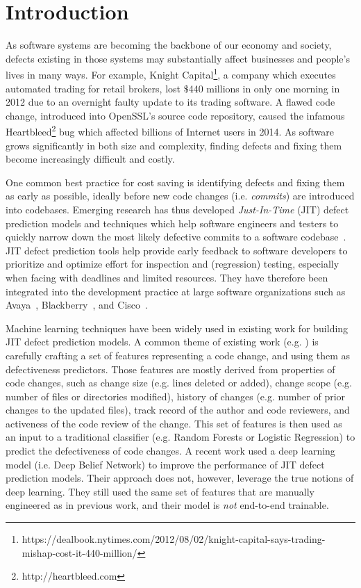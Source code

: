 \section{Introduction}
\label{sec:intro}
As software systems are becoming the backbone of our economy and society, defects existing in those systems may substantially affect businesses and people's lives  in many ways. For example, Knight Capital\footnote{https://dealbook.nytimes.com/2012/08/02/knight-capital-says-trading-mishap-cost-it-440-million/}, a company which executes automated trading  for retail brokers, lost $\$$440 millions in only one morning in 2012 due to an overnight faulty update to its trading software. A flawed code change, introduced into OpenSSL's source code repository, caused the infamous Heartbleed\footnote{http://heartbleed.com} bug which affected billions of Internet users in 2014. As software grows significantly in both size and complexity, finding defects and fixing them become increasingly difficult and costly.

One common best practice for cost saving is identifying defects and fixing them as early as possible, ideally before new code changes (i.e. \emph{commits}) are introduced into codebases. Emerging research has thus developed \emph{Just-In-Time} (JIT) defect prediction models and techniques which help software engineers and testers to quickly narrow down the most likely defective commits to a software codebase~\cite{KameiS16,D'Ambros:2012:EDP}. JIT defect prediction tools help provide early feedback to software developers to prioritize and optimize effort for inspection and (regression) testing, especially when facing with deadlines and limited resources. They have therefore been integrated into the development practice at large software organizations such as Avaya~\cite{Mockus2000}, Blackberry~\cite{Shihab:2012:ISR}, and Cisco~\cite{Tantithamthavorn:2015:IMP}.

Machine learning techniques have been widely used in existing work for building JIT defect prediction models. A common theme of existing work (e.g. \cite{Kamei:2013:LES,Kim:2008:CSC,Kononenko:2015,Mockus2000}) is carefully crafting a set of features representing a code change, and using them as defectiveness predictors. Those features are mostly derived from properties of code changes, such as change size (e.g. lines deleted or added), change scope (e.g. number of files or directories modified), history of changes (e.g. number of prior changes to the updated files), track record of the author and code reviewers, and activeness of the code review of the change. This set of features is then used as an input to a traditional classifier (e.g. Random Forests or Logistic Regression) to predict the defectiveness of code changes. A recent work \cite{Yang:2015:DLJ}  used a deep learning model (i.e. Deep Belief Network) to improve the performance of JIT defect prediction models. Their approach does not, however, leverage the true notions of deep learning. They still used the same set of features that are manually engineered as in previous work, and their model is \emph{not} end-to-end trainable.

